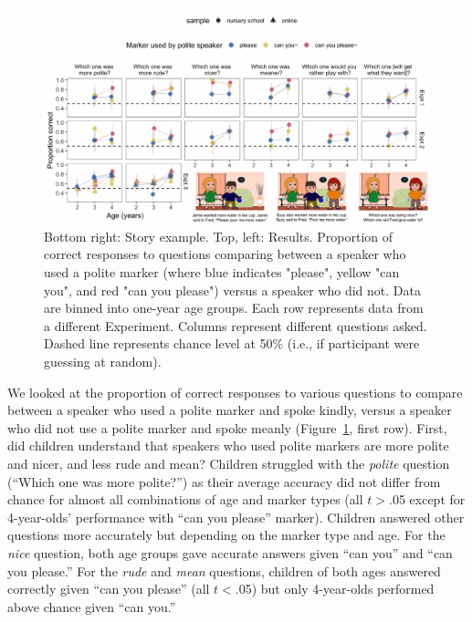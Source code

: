 \documentclass[10pt, letterpaper]{article}
\newenvironment{CodeChunk}{}{}
\begin{document}
\begin{CodeChunk}
\captionsetup{width=0.8\textwidth}\begin{figure}[h]

{\centering \includegraphics{figs/fig_results_placement-1} 

}

\caption[Bottom right]{Bottom right: Story example. Top, left: Results. Proportion of correct responses to questions comparing between a speaker who used a polite marker (where blue indicates "please", yellow "can you", and red "can you please") versus a speaker who did not. Data are binned into one-year age groups. Each row represents data from a different Experiment. Columns represent different questions asked. Dashed line represents chance level at 50\% (i.e., if participant were guessing at random).}\label{fig:fig_results_placement}
\end{figure}
\end{CodeChunk}

We looked at the proportion of correct responses to various questions to
compare between a speaker who used a polite marker and spoke kindly,
versus a speaker who did not use a polite marker and spoke meanly
(Figure~\ref{fig:fig_results_placement}, first row). First, did children
understand that speakers who used polite markers are more polite and
nicer, and less rude and mean? Children struggled with the \emph{polite}
question (``Which one was more polite?'') as their average accuracy did
not differ from chance for almost all combinations of age and marker
types (all \(t>\).05 except for 4-year-olds' performance with ``can you
please'' marker). Children answered other questions more accurately but
depending on the marker type and age. For the \emph{nice} question, both
age groups gave accurate answers given ``can you'' and ``can you
please.'' For the \emph{rude} and \emph{mean} questions, children of
both ages answered correctly given ``can you please'' (all \(t<\).05)
but only 4-year-olds performed above chance given ``can you.''
\end{document}
